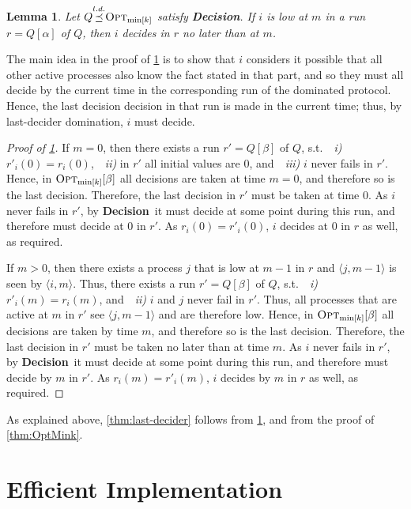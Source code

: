 \documentclass[11pt]{article}
\newtheorem{lemma}{Lemma}
\theoremstyle{definition}
\newcommand{\OptMink}{\mbox{$\mbox{\sc Opt}_{\min[k]}$}}
\newcommand{\dom}{\,{\preceq}\,}
\newcommand{\node}[1]{\langle#1\rangle}
\newcommand{\Decision}{{\bf Decision}}
\begin{document}
\begin{lemma}\label{last-dom-sufficient}
Let $Q\overset{\smash{l.d.}}{\dom}\OptMink$ satisfy \Decision. If $i$ is low at $m$ in a run $r\!=\!Q[\alpha]$ of $Q$, then $i$ decides in $r$ no later than at $m$.
\end{lemma}

The main idea in the proof of \cref{last-dom-sufficient} is to show that $i$ considers it possible that
all other active processes also know the fact stated in that part,
and so they must all decide by the current time in the corresponding run of the dominated protocol. Hence, the last decision decision in that run is made in the current time; thus, by last-decider domination, $i$ must decide.

\begin{proof}[Proof of \cref{last-dom-sufficient}]
If $m\!=\!0$, then there exists a run $r'\!=\!Q[\beta]$ of $Q$, s.t.~~\emph{i)} $r'_i(0)\!=\!r_i(0)$,~~\emph{ii)} in $r'$ all initial values are $0$, and~~\emph{iii)} $i$ never fails in $r'$. Hence, in $\OptMink[\beta]$ all decisions
are taken at time $m\!=\!0$, and therefore so is the last decision. Therefore, the last decision in $r'$ must be taken at time $0$. As $i$ never fails in $r'$, by \Decision\ it must decide at some
point during this run, and therefore must decide at $0$ in $r'$. As $r_i(0)\!=\!r'_i(0)$, $i$ decides at $0$ in $r$ as well, as required.

If $m\!>\!0$, then there exists a process $j$ that is low at $m-1$ in $r$ and $\node{j,m-1}$ is seen by $\node{i,m}$. Thus, there exists a run $r'\!=\!Q[\beta]$ of $Q$,
s.t.~~\emph{i)} $r'_i(m)\!=\!r_i(m)$, and~~\emph{ii)} $i$ and $j$ never fail in $r'$. Thus, all processes that are active at $m$ in $r'$ see $\node{j,m-1}$ and are therefore low.
Hence, in $\OptMink[\beta]$ all decisions are taken by time $m$, and therefore so is the last decision. Therefore, the last decision in $r'$ must be taken no later than at time $m$.
As $i$ never fails in $r'$, by \Decision\ it must decide at some point during this run, and therefore must decide by $m$ in $r'$. As $r_i(m)\!=\!r'_i(m)$, $i$ decides by $m$ in $r$ as well, as required.
\end{proof}

As explained above, \cref{thm:last-decider} follows from \cref{last-dom-sufficient}, and from the proof of \cref{thm:OptMink}.

\section{Efficient Implementation}\label{sec-com-eff}
\end{document}
